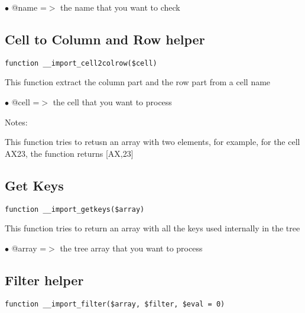 \documentclass[a4paper]{book}
\begin{document}
\begin{compactitem}
\item[\color{myblue}$\bullet$] @name =$>$ the name that you want to check
\end{compactitem}

\hypertarget{toc168}{}
\subsection{Cell to Column and Row helper}

\begin{lstlisting}
function __import_cell2colrow($cell)
\end{lstlisting}

This function extract the column part and the row part from a cell name

\begin{compactitem}
\item[\color{myblue}$\bullet$] @cell =$>$ the cell that you want to process
\end{compactitem}

Notes:

This function tries to retusn an array with two elements, for example, for
the cell AX23, the function returns [AX,23]

\hypertarget{toc169}{}
\subsection{Get Keys}

\begin{lstlisting}
function __import_getkeys($array)
\end{lstlisting}

This function tries to return an array with all the keys used internally
in the tree

\begin{compactitem}
\item[\color{myblue}$\bullet$] @array =$>$ the tree array that you want to process
\end{compactitem}

\hypertarget{toc170}{}
\subsection{Filter helper}

\begin{lstlisting}
function __import_filter($array, $filter, $eval = 0)
\end{lstlisting}
\end{document}
